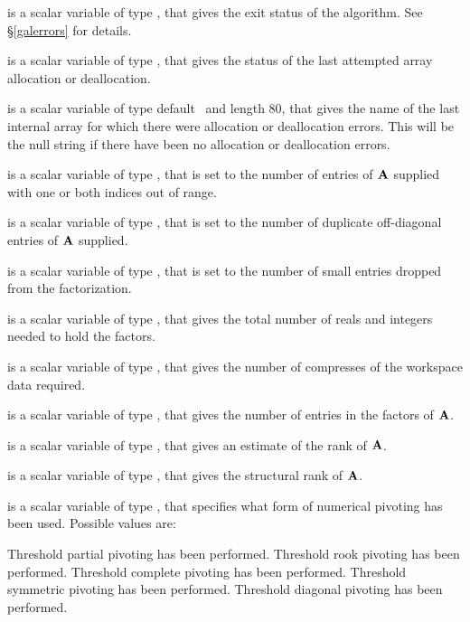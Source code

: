 \documentclass{galahad}
\begin{document}
\begin{description}

 is a scalar variable of type \integer, that gives the
exit status of the algorithm.
See \S\ref{galerrors}
for details.

 is a scalar variable of type \integer, that gives
the status of the last attempted array allocation or deallocation.

 is a scalar variable of type default \character\
and length 80, that  gives the name of the last internal array
for which there were allocation or deallocation errors.
This will be the null string if there have been no
allocation or deallocation errors.


 is a scalar variable of type \longinteger,
that is set to the number of
entries of ${\mathbf{A}}$ supplied with one or both indices out of range.

 is a scalar variable of type \longinteger,
that is set to the number of duplicate off-diagonal entries of ${\mathbf{A}}$ supplied.

 is a scalar variable of type \longinteger,
that is set to the number of small entries dropped from the factorization.

 is a scalar variable of type \longinteger,
that gives the total number of reals and integers needed to hold the
factors.

 is a scalar variable of type \integer,
that gives the number of compresses of the workspace data required.

 is a scalar variable of type \longinteger,
that gives the number of entries in the factors of ${\mathbf{A}}$.

 is a scalar variable of type \integer,
that gives an estimate of the rank of ${\mathbf{A}}$.

 is a scalar variable of type \integer,
that gives the structural rank of ${\mathbf{A}}$.

 is a scalar variable of type \integer,
that specifies what form of numerical pivoting has been used.
Possible values are:
\begin{description}
   Threshold partial pivoting has been performed.
   Threshold rook pivoting has been performed.
   Threshold complete pivoting has been performed.
   Threshold symmetric pivoting has been performed.
   Threshold diagonal pivoting has been performed.
\end{description}


\end{description}
\end{document}
